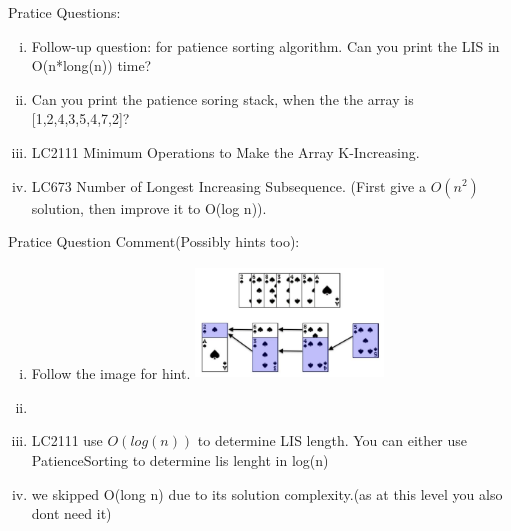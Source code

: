 Pratice Questions:
\begin{enumerate}[(i)]
    \item Follow-up question: for patience sorting algorithm. Can you print the LIS in O(n*long(n)) time?
    \item Can you print the patience soring stack, when the the array is [1,2,4,3,5,4,7,2]?
    \item LC2111  Minimum Operations to Make the Array K-Increasing.
    \item LC673  Number of Longest Increasing Subsequence. (First give a $O(n^2)$ solution, then improve it to O(log n)).
\end{enumerate}

\vspace{3cm}
Pratice Question Comment(Possibly hints too):
\begin{enumerate}[(i)]
    \item Follow the image for hint. \includegraphics[width=5cm,height=3cm]{./resources/LICSequence.png}
    \item 
    \item LC2111 use $O(log(n))$ to determine LIS length. You can either use PatienceSorting to determine lis lenght in log(n) 
    \item we skipped O(long n) due to its solution complexity.(as at this level you also dont need it)
\end{enumerate}
